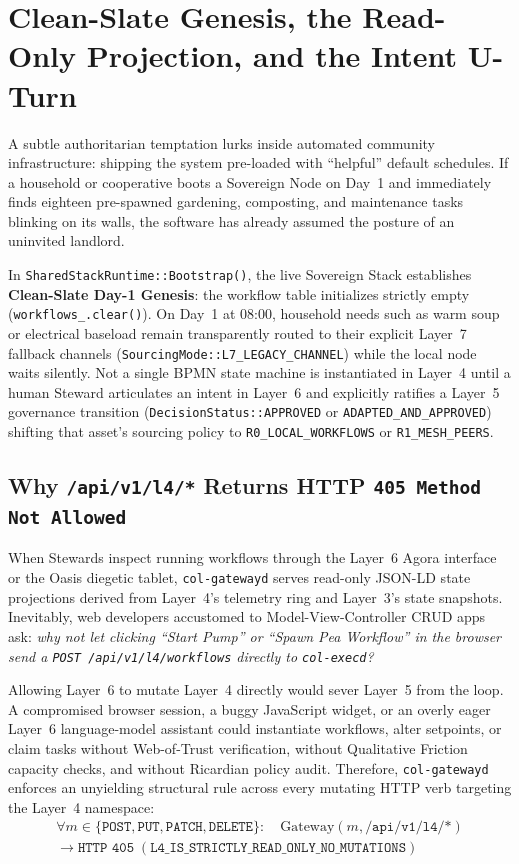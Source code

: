 \section{Clean-Slate Genesis, the Read-Only Projection, and the Intent U-Turn}
\label{sec:ch1-intent-uturn}

A subtle authoritarian temptation lurks inside automated community infrastructure: shipping
the system pre-loaded with ``helpful'' default schedules. If a household or cooperative
boots a Sovereign Node on Day~1 and immediately finds eighteen pre-spawned gardening,
composting, and maintenance tasks blinking on its walls, the software has already assumed
the posture of an uninvited landlord.

In \texttt{SharedStackRuntime::Bootstrap()}, the live Sovereign Stack establishes
\textbf{Clean-Slate Day-1 Genesis}: the workflow table initializes strictly empty
(\texttt{workflows\_.clear()}). On Day~1 at 08:00, household needs such as warm soup or
electrical baseload remain transparently routed to their explicit Layer~7 fallback channels
(\texttt{SourcingMode::L7\_LEGACY\_CHANNEL}) while the local node waits silently. Not a
single BPMN state machine is instantiated in Layer~4 until a human Steward articulates an
intent in Layer~6 and explicitly ratifies a Layer~5 governance transition
(\texttt{DecisionStatus::APPROVED} or \texttt{ADAPTED\_AND\_APPROVED}) shifting that asset's
sourcing policy to \texttt{R0\_LOCAL\_WORKFLOWS} or \texttt{R1\_MESH\_PEERS}.

\subsection{Why \texttt{/api/v1/l4/*} Returns HTTP \texttt{405 Method Not Allowed}}

When Stewards inspect running workflows through the Layer~6 Agora interface or the Oasis
diegetic tablet, \texttt{col-gatewayd} serves read-only JSON-LD state projections derived
from Layer~4's telemetry ring and Layer~3's state snapshots. Inevitably, web developers
accustomed to Model-View-Controller CRUD apps ask: \textit{why not let clicking ``Start
Pump'' or ``Spawn Pea Workflow'' in the browser send a \texttt{POST /api/v1/l4/workflows}
directly to \texttt{col-execd}?}

Allowing Layer~6 to mutate Layer~4 directly would sever Layer~5 from the loop. A compromised
browser session, a buggy JavaScript widget, or an overly eager Layer~6 language-model
assistant could instantiate workflows, alter setpoints, or claim tasks without Web-of-Trust
verification, without Qualitative Friction capacity checks, and without Ricardian policy
audit. Therefore, \texttt{col-gatewayd} enforces an unyielding structural rule across every
mutating HTTP verb targeting the Layer~4 namespace:
\begin{equation}
\begin{aligned}
\forall m \in \{\texttt{POST}, \texttt{PUT}, \texttt{PATCH}, \texttt{DELETE}\}: \quad
\mathrm{Gateway}(m, \texttt{/api/v1/l4/*}) \\
\longrightarrow \texttt{HTTP 405} \; (\texttt{L4\_IS\_STRICTLY\_READ\_ONLY\_NO\_MUTATIONS})
\end{aligned}
\end{equation}

